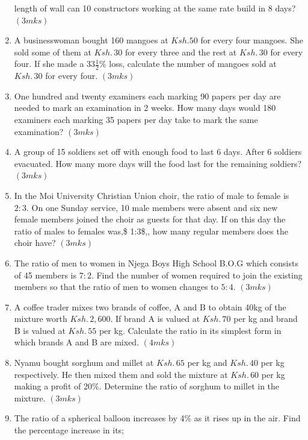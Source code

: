 \documentclass[
  letterpaper,
  DIV=11,
  numbers=noendperiod]{scrreprt}
\begin{document}
\begin{tcolorbox}
\begin{enumerate}
  length of wall can 10 constructors working at the same rate build in 8
  days? \hspace{5.8 cm} \((3mks)\)
\item
  A businesswoman bought 160 mangoes at \(Ksh. 50\) for every four
  mangoes. She sold some of them at \(Ksh. \,30\) for every three and
  the rest at \(Ksh.\, 30\) for every four. If she made a
  33\(\frac{1}{2}\)\% loss, calculate the number of mangoes sold at
  \(Ksh.\, 30\) for every four. \hspace{5 cm} \((3mks)\)
\item
  One hundred and twenty examiners each marking 90 papers per day are
  needed to mark an examination in 2 weeks. How many days would 180
  examiners each marking 35 papers per day take to mark the same
  examination? \hspace{8.2 cm} \((3mks)\)
\item
  A group of 15 soldiers set off with enough food to last 6 days. After
  6 soldiers evacuated. How many more days will the food last for the
  remaining soldiers? \hspace{4 cm} \((3 mks)\)
\item
  In the Moi University Christian Union choir, the ratio of male to
  female is \(2:3\). On one Sunday service, 10 male members were absent
  and six new female members joined the choir as guests for that day. If
  on this day the ratio of males to females was,\$ 1:3\$,, how many
  regular members does the choir have? \hspace{11.8 cm} \((3mks)\)
\item
  The ratio of men to women in Njega Boys High School B.O.G which
  consists of 45 members is \(7: 2\). Find the number of women required
  to join the existing members so that the ratio of men to women changes
  to \(5: 4\). \hspace{10.1cm} \((3mks)\)
\item
  A coffee trader mixes two brands of coffee, A and B to obtain 40kg of
  the mixture worth \(Ksh.\, 2,600\). If brand A is valued at
  \(Ksh.\, 70\) per kg and brand B is valued at \(Ksh.\, 55\) per kg.
  Calculate the ratio in its simplest form in which brands A and B are
  mixed. \hspace{3.7 cm} \((4mks)\)
\item
  Nyamu bought sorghum and millet at \(Ksh.\,65\) per kg and
  \(Ksh.\,40\) per kg respectively. He then mixed them and sold the
  mixture at \(Ksh.\,60\) per kg making a profit of 20\%. Determine the
  ratio of sorghum to millet in the mixture. \hspace{8.5 cm} \((3mks)\)
\item
  The ratio of a spherical balloon increases by 4\% as it rises up in
  the air. Find the percentage increase in its;


\end{enumerate}
\end{tcolorbox}
\end{document}
